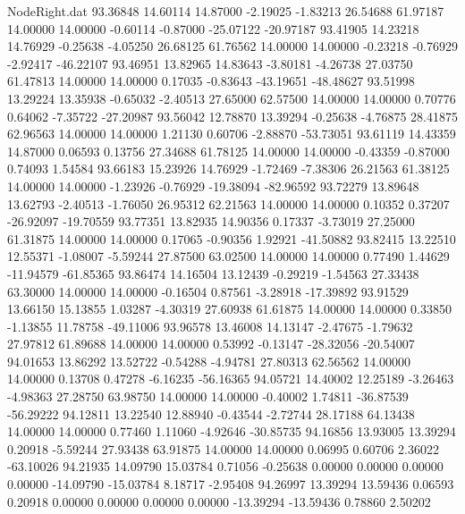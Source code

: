 \begin{filecontents}{NodeRight.dat}
  93.36848   14.60114   14.87000    -2.19025   -1.83213   26.54688   61.97187   14.00000   14.00000   -0.60114   -0.87000  -25.07122  -20.97187
  93.41905   14.23218   14.76929    -0.25638   -4.05250   26.68125   61.76562   14.00000   14.00000   -0.23218   -0.76929   -2.92417  -46.22107
  93.46951   13.82965   14.83643    -3.80181   -4.26738   27.03750   61.47813   14.00000   14.00000    0.17035   -0.83643  -43.19651  -48.48627
  93.51998   13.29224   13.35938    -0.65032   -2.40513   27.65000   62.57500   14.00000   14.00000    0.70776    0.64062   -7.35722  -27.20987
  93.56042   12.78870   13.39294    -0.25638   -4.76875   28.41875   62.96563   14.00000   14.00000    1.21130    0.60706   -2.88870  -53.73051
  93.61119   14.43359   14.87000     0.06593    0.13756   27.34688   61.78125   14.00000   14.00000   -0.43359   -0.87000    0.74093    1.54584
  93.66183   15.23926   14.76929    -1.72469   -7.38306   26.21563   61.38125   14.00000   14.00000   -1.23926   -0.76929  -19.38094  -82.96592
  93.72279   13.89648   13.62793    -2.40513   -1.76050   26.95312   62.21563   14.00000   14.00000    0.10352    0.37207  -26.92097  -19.70559
  93.77351   13.82935   14.90356     0.17337   -3.73019   27.25000   61.31875   14.00000   14.00000    0.17065   -0.90356    1.92921  -41.50882
  93.82415   13.22510   12.55371    -1.08007   -5.59244   27.87500   63.02500   14.00000   14.00000    0.77490    1.44629  -11.94579  -61.85365
  93.86474   14.16504   13.12439    -0.29219   -1.54563   27.33438   63.30000   14.00000   14.00000   -0.16504    0.87561   -3.28918  -17.39892
  93.91529   13.66150   15.13855     1.03287   -4.30319   27.60938   61.61875   14.00000   14.00000    0.33850   -1.13855   11.78758  -49.11006
  93.96578   13.46008   14.13147    -2.47675   -1.79632   27.97812   61.89688   14.00000   14.00000    0.53992   -0.13147  -28.32056  -20.54007
  94.01653   13.86292   13.52722    -0.54288   -4.94781   27.80313   62.56562   14.00000   14.00000    0.13708    0.47278   -6.16235  -56.16365
  94.05721   14.40002   12.25189    -3.26463   -4.98363   27.28750   63.98750   14.00000   14.00000   -0.40002    1.74811  -36.87539  -56.29222
  94.12811   13.22540   12.88940    -0.43544   -2.72744   28.17188   64.13438   14.00000   14.00000    0.77460    1.11060   -4.92646  -30.85735
  94.16856   13.93005   13.39294     0.20918   -5.59244   27.93438   63.91875   14.00000   14.00000    0.06995    0.60706    2.36022  -63.10026
  94.21935   14.09790   15.03784     0.71056   -0.25638    0.00000    0.00000    0.00000    0.00000  -14.09790  -15.03784    8.18717   -2.95408
  94.26997   13.39294   13.59436     0.06593    0.20918    0.00000    0.00000    0.00000    0.00000  -13.39294  -13.59436    0.78860    2.50202

\end{filecontents}
